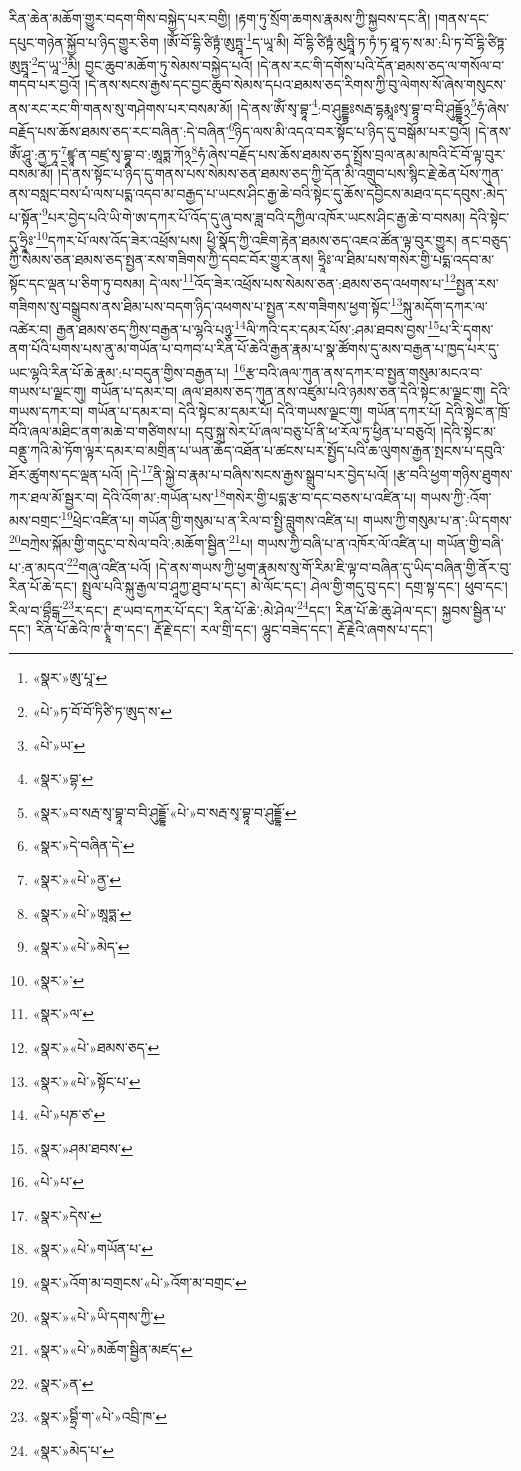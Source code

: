 རིན་ཆེན་མཆོག་གྱུར་བདག་གིས་བསྐྱེད་པར་བགྱི། །རྟག་ཏུ་སྲོག་ཆགས་རྣམས་ཀྱི་སྐྱབས་དང་ནི། །གནས་དང་དཔུང་གཉེན་སྐྱོབ་པ་ཉིད་གྱུར་ཅིག །ཨོཾ་བོ་དྷི་ཙིཏྟཾ་ཨུཏྤཱ་\footnote{«སྣར་»ཨུ་པཱ་}ད་ཡཱ་མི། བོ་དྷི་ཙིཏྟཾ་མུཏྤཱི་ཏ་ཏཾ་ཏ་ཐཱ་ཧ་ས་མ་:པི་ཏ་བོ་དྷི་ཙིཏྟ་ཨུཏྤཱ་\footnote{«པེ་»ཏ་བོ་བོ་ཏིཙི་ཏ་ཨུད་ས་}ད་ཡཱ་\footnote{«པེ་»ཡ་}མི། བྱང་ཆུབ་མཆོག་ཏུ་སེམས་བསྐྱེད་པའོ། །དེ་ནས་རང་གི་དགོས་པའི་དོན་ཐམས་ཅད་ལ་གསོལ་བ་གདབ་པར་བྱའོ། །དེ་ནས་སངས་རྒྱས་དང་བྱང་ཆུབ་སེམས་དཔའ་ཐམས་ཅད་རིགས་ཀྱི་བུ་ལེགས་སོ་ཞེས་གསུངས་ནས་རང་རང་གི་གནས་སུ་གཤེགས་པར་བསམ་མོ། །དེ་ནས་ཨོཾ་སྭ་བྷཱ་\footnote{«སྣར་»བྷ་}:བ་ཤུདྡྷཿསརྦ་དྷརྨཱཿསྭ་བྷཱ་བ་བི་ཤུདྡྷོ྅\footnote{«སྣར་»བ་སརྦ་སྭ་བྷཱ་བ་བི་ཤུདྡྷོ་«པེ་»བ་སརྦ་སྭ་བྷཱ་བ་ཤུདྡྷོ་}ཧཾ་ཞེས་བརྗོད་པས་ཆོས་ཐམས་ཅད་རང་བཞིན་:དེ་བཞིན་\footnote{«སྣར་»དེ་བཞིན་དེ་}ཉིད་ལས་མི་འདའ་བར་སྟོང་པ་ཉིད་དུ་བསྒོམ་པར་བྱའོ། །དེ་ནས་ཨོཾ་ཤཱུ་:ནྱ་ཏཱ་\footnote{«སྣར་»«པེ་»ནྱ་}ཛྙཱ་ན་བཛྲ་སྭ་བྷཱ་བ་:ཨཱཏྨ་ཀོ྅\footnote{«སྣར་»«པེ་»ཨཱཏྨ་}ཧཾ་ཞེས་བརྗོད་པས་ཆོས་ཐམས་ཅད་སྤྲོས་བྲལ་ནམ་མཁའི་ངོ་བོ་ལྟ་བུར་བསམ་མོ། །དེ་ནས་སྟོང་པ་ཉིད་དུ་གནས་པས་སེམས་ཅན་ཐམས་ཅད་ཀྱི་དོན་མི་འགྲུབ་པས་སྙིང་རྗེ་ཆེན་པོས་ཀུན་ནས་བསླང་བས་པཾ་ལས་པདྨ་འདབ་མ་བརྒྱད་པ་ཡངས་ཤིང་རྒྱ་ཆེ་བའི་སྟེང་དུ་ཆོས་དབྱིངས་མཐའ་དང་དབུས་:མེད་པ་སྟོན་\footnote{«སྣར་»«པེ་»མེད་}པར་བྱེད་པའི་ཡི་གེ་ཨ་དཀར་པོ་འོད་དུ་ཞུ་བས་ཟླ་བའི་དཀྱིལ་འཁོར་ཡངས་ཤིང་རྒྱ་ཆེ་བ་བསམ། དེའི་སྟེང་དུ་ཧྲཱིཿ་\footnote{«སྣར་»་}དཀར་པོ་ལས་འོད་ཟེར་འཕྲོས་པས། ཕྱི་སྣོད་ཀྱི་འཇིག་རྟེན་ཐམས་ཅད་འཇའ་ཚོན་ལྟ་བུར་གྱུར། ནང་བཅུད་ཀྱི་སེམས་ཅན་ཐམས་ཅད་སྤྱན་རས་གཟིགས་ཀྱི་དབང་བོར་གྱུར་ནས། ཧྲཱིཿ་ལ་ཐིམ་པས་གསེར་གྱི་པདྨ་འདབ་མ་སྟོང་དང་ལྡན་པ་ཅིག་ཏུ་བསམ། དེ་ལས་\footnote{«སྣར་»ལ་}འོད་ཟེར་འཕྲོས་པས་སེམས་ཅན་:ཐམས་ཅད་འཕགས་པ་\footnote{«སྣར་»«པེ་»ཐམས་ཅད་}སྤྱན་རས་གཟིགས་སུ་བསྒྲུབས་ནས་ཐིམ་པས་བདག་ཉིད་འཕགས་པ་སྤྱན་རས་གཟིགས་ཕྱག་སྟོང་\footnote{«སྣར་»«པེ་»སྟོང་པ་}སྐུ་མདོག་དཀར་ལ་འཚེར་བ། རྒྱན་ཐམས་ཅད་ཀྱིས་བརྒྱན་པ་ལྷའི་པཉྩ་\footnote{«པེ་»པཎ་ཙ་}ལི་ཀའི་དར་དམར་པོས་:ཤམ་ཐབས་བྱས་\footnote{«སྣར་»ཤམ་ཐབས་}པ་རི་དྭགས་ནག་པོའི་པགས་པས་ནུ་མ་གཡོན་པ་བཀབ་པ་རིན་པོ་ཆེའི་རྒྱན་རྣམ་པ་སྣ་ཚོགས་དུ་མས་བརྒྱན་པ་ཁྱད་པར་དུ་ཡང་ལྷའི་རིན་པོ་ཆེ་རྣམ་:པ་བདུན་གྱིས་བརྒྱན་པ། \footnote{«པེ་»པ་}རྩ་བའི་ཞལ་ཀུན་ནས་དཀར་བ་སྤྱན་གསུམ་མངའ་བ་གཡས་པ་ལྗང་གུ། གཡོན་པ་དམར་བ། ཞལ་ཐམས་ཅད་ཀུན་ནས་འཛུམ་པའི་ཉམས་ཅན་དེའི་སྟེང་མ་ལྗང་གུ། དེའི་གཡས་དཀར་བ། གཡོན་པ་དམར་བ། དེའི་སྟེང་མ་དམར་པོ། དེའི་གཡས་ལྗང་གུ། གཡོན་དཀར་པོ། དེའི་སྟེང་ན་ཁྲོ་བོའི་ཞལ་མཐིང་ནག་མཆེ་བ་གཙིགས་པ། དབུ་སྐྲ་སེར་པོ་ཞལ་བཅུ་པོ་ནི་ཕ་རོལ་ཏུ་ཕྱིན་པ་བཅུའོ། །དེའི་སྟེང་མ་བནྡུ་ཀའི་མེ་ཏོག་ལྟར་དམར་བ་མགྲིན་པ་ཡན་ཆོད་འཐོན་པ་ཚངས་པར་སྤྱོད་པའི་ཆ་ལུགས་རྒྱན་སྤངས་པ་དབུའི་ཐོར་ཚུགས་དང་ལྡན་པའོ། །དེ་\footnote{«སྣར་»དེས་}ནི་སྐྱེ་བ་རྣམ་པ་བཞིས་སངས་རྒྱས་སྒྲུབ་པར་བྱེད་པའོ། །རྩ་བའི་ཕྱག་གཉིས་ཐུགས་ཀར་ཐལ་མོ་སྦྱར་བ། དེའི་འོག་མ་:གཡོན་པས་\footnote{«སྣར་»«པེ་»གཡོན་པ་}གསེར་གྱི་པདྨ་རྩ་བ་དང་བཅས་པ་འཛིན་པ། གཡས་ཀྱི་:འོག་མས་བགྲང་\footnote{«སྣར་»འོག་མ་བགྲངས་«པེ་»འོག་མ་བགྲང་}ཕྲེང་འཛིན་པ། གཡོན་གྱི་གསུམ་པ་ན་རིལ་བ་སྤྱི་བླུགས་འཛིན་པ། གཡས་ཀྱི་གསུམ་པ་ན་:ཡི་དགས་\footnote{«སྣར་»«པེ་»ཡི་དགས་ཀྱི་}བཀྲེས་སྐོམ་གྱི་གདུང་བ་སེལ་བའི་:མཆོག་སྦྱིན་\footnote{«སྣར་»«པེ་»མཆོག་སྦྱིན་མཛད་}པ། གཡས་ཀྱི་བཞི་པ་ན་འཁོར་ལོ་འཛིན་པ། གཡོན་གྱི་བཞི་པ་:ན་མདའ་\footnote{«སྣར་»ན་}གཞུ་འཛིན་པའོ། །དེ་ནས་གཡས་ཀྱི་ཕྱག་རྣམས་སུ་གོ་རིམ་ཇི་ལྟ་བ་བཞིན་དུ་ཡིད་བཞིན་གྱི་ནོར་བུ་རིན་པོ་ཆེ་དང་། སྤྲུལ་པའི་སྐུ་རྒྱལ་བ་ཤཱཀྱ་ཐུབ་པ་དང་། མེ་ལོང་དང་། ཤེལ་གྱི་གདུ་བུ་དང་། དགྲ་སྟ་དང་། ཕུབ་དང་། རིལ་བ་བྷྲྀངྒ་\footnote{«སྣར་»བྷྲིཾ་ག་«པེ་»འབྲི་ཁ་}ར་དང་། རྔ་ཡབ་དཀར་པོ་དང་། རིན་པོ་ཆེ་:མེ་ཤེལ་\footnote{«སྣར་»མེད་པ་}དང་། རིན་པོ་ཆེ་ཆུ་ཤེལ་དང་། སྐྱབས་སྦྱིན་པ་དང་། རིན་པོ་ཆེའི་ཁ་ཊྭཱཾ་ག་དང་། རྡོ་རྗེ་དང་། རལ་གྲི་དང་། ལྷུང་བཟེད་དང་། རྡོ་རྗེའི་ཞགས་པ་དང་། 